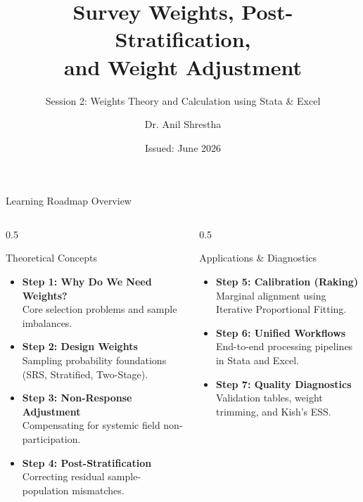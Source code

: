 \documentclass[10pt, aspectratio=169]{beamer}
\title[Survey Weights \& Calibration]{Survey Weights, Post-Stratification, \\ and Weight Adjustment}
\subtitle{Session 2: Weights Theory and Calculation using Stata \& Excel}
\author[Dr. Anil Shrestha]{Dr. Anil Shrestha}
\institute[NSO]{Prepared for National Statistics Office (NSO) Training Participants \\ and Survey Practitioners}
\date[June 2026]{Issued: June 2026}
\begin{document}
\begin{frame}[plain]
  \titlepage
\end{frame}

\begin{frame}{Learning Roadmap Overview}
  \begin{columns}[T]
    \begin{column}{0.5\textwidth}
      \begin{block}{Theoretical Concepts}
        \begin{itemize}
          \item \textbf{Step 1: Why Do We Need Weights?} \\ Core selection problems and sample imbalances.
          \item \textbf{Step 2: Design Weights} \\ Sampling probability foundations (SRS, Stratified, Two-Stage).
          \item \textbf{Step 3: Non-Response Adjustment} \\ Compensating for systemic field non-participation.
          \item \textbf{Step 4: Post-Stratification} \\ Correcting residual sample-population mismatches.
        \end{itemize}
      \end{block}
    \end{column}
    \begin{column}{0.5\textwidth}
      \begin{block}{Applications \& Diagnostics}
        \begin{itemize}
          \item \textbf{Step 5: Calibration (Raking)} \\ Marginal alignment using Iterative Proportional Fitting.
          \item \textbf{Step 6: Unified Workflows} \\ End-to-end processing pipelines in Stata and Excel.
          \item \textbf{Step 7: Quality Diagnostics} \\ Validation tables, weight trimming, and Kish's ESS.
        \end{itemize}
      \end{block}
    \end{column}
  \end{columns}
\end{frame}
\end{document}
